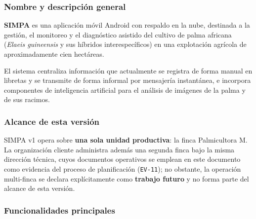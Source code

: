 \documentclass[11pt,a4paper]{article}
\newcommand{\id}[1]{\texttt{\begingroup\hyphenpenalty=10000\relax#1\endgroup}}
\renewcommand{\id}[1]{\texttt{#1}}
\begin{document}
\subsubsection{Nombre y descripción general}

\textbf{SIMPA} es una aplicación móvil Android con respaldo en la nube, destinada a la gestión,
el monitoreo y el diagnóstico asistido del cultivo de palma africana (\emph{Elaeis guineensis} y
sus híbridos interespecíficos) en una explotación agrícola de aproximadamente cien hectáreas.

El sistema centraliza información que actualmente se registra de forma manual en libretas y se
transmite de forma informal por mensajería instantánea, e incorpora componentes de inteligencia
artificial para el análisis de imágenes de la palma y de sus racimos.

\subsubsection{Alcance de esta versión}

SIMPA v1 opera sobre \textbf{una sola unidad productiva}: la finca Palmicultora M. La organización
cliente administra además una segunda finca bajo la misma dirección técnica, cuyos documentos
operativos se emplean en este documento como evidencia del proceso de planificación
(\id{EV-11}); no obstante, la operación multi-finca se declara explícitamente como
\textbf{trabajo futuro} y no forma parte del alcance de esta versión.

\subsubsection{Funcionalidades principales}
\end{document}
